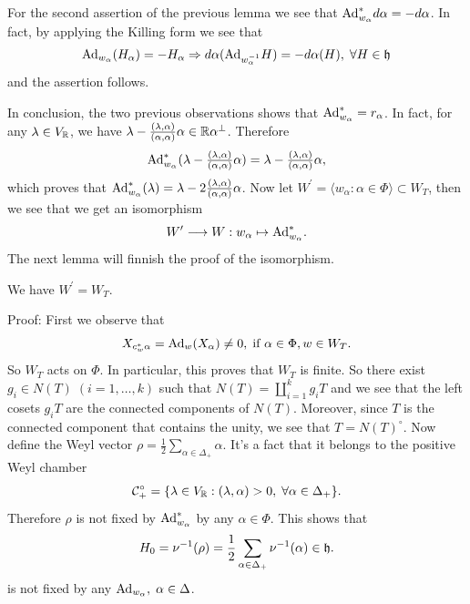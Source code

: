 For the second assertion of the previous lemma we see that $\text{Ad}_{w_\alpha}^*d\alpha=-d\alpha$. In fact, by applying 
the Killing form we see that
\begin{equation}
    \begin{split}
        \text{Ad}_{w_\alpha}(H_\alpha)=-H_\alpha\Rightarrow d\alpha(\text{Ad}_{w_\alpha^{-1}}H)=-d\alpha(H),\;\forall H\in\mathfrak{h}
    \end{split}
\end{equation}
and the assertion follows.\par 

In conclusion, the two previous observations shows that $\text{Ad}_{w_\alpha}^*=r_\alpha$. In fact, for any $\lambda\in V_{\mathbb{R}}$, 
we have $\lambda-\tfrac{(\lambda,\alpha)}{(\alpha,\alpha)}\alpha\in \mathbb{R}\alpha^\perp$. Therefore 
\begin{equation}
    \text{Ad}_{w_\alpha}^*(\lambda-\tfrac{(\lambda,\alpha)}{(\alpha,\alpha)}\alpha)
    =\lambda-\tfrac{(\lambda,\alpha)}{(\alpha,\alpha)}\alpha,
\end{equation}
which proves that $\text{Ad}_{w_\alpha}^*(\lambda)=\lambda-2\tfrac{(\lambda,\alpha)}{(\alpha,\alpha)}\alpha$. Now let 
$W^\prime=\langle w_\alpha:\alpha\in\Phi \rangle\subset W_T$, then we see that we get an isomorphism
\begin{equation}
    W^\prime \longrightarrow W: w_\alpha\mapsto \text{Ad}_{w_\alpha}^*.
\end{equation}
The next lemma will finnish the proof of the isomorphism.

\begin{dang}
    \begin{lemma}
        We have $W^\prime = W_T$.
    \end{lemma}
\end{dang}
Proof: First we observe that
\begin{equation}
    X_{c_w^*\alpha}=\text{Ad}_w(X_\alpha)\neq0,\;\text{if } \alpha\in\Phi,w\in W_T.
\end{equation}
So $W_T$ acts on $\Phi$. In particular, this proves that $W_T$ is finite. So there exist $g_i\in N(T)\;(i=1,\dots,k)$ such that
$N(T)=\coprod_{i=1}^kg_iT$ and we see that the left cosets $g_iT$ are the connected components of $N(T)$. 
Moreover, since $T$ is the connected component that contains the unity, we see that $T=N(T)^\circ$. Now define 
the Weyl vector $\rho=\tfrac12\sum_{\alpha\in\Delta_+}\alpha$. It's a fact that it belongs to the positive Weyl chamber 
\begin{equation}
    \mathcal{C}_+^\circ = \{\lambda\in V_{\mathbb{R}}: (\lambda,\alpha)>0,\;\forall\alpha\in\Delta_+\}.
\end{equation}
Therefore $\rho$ is not fixed by $\text{Ad}_{w_\alpha}^*$ by any $\alpha\in\Phi$. This shows that 
\begin{equation}
   H_0= \nu^{-1}(\rho)=\frac12\sum_{\alpha\in\Delta_+}\nu^{-1}(\alpha)\in\mathfrak{h}.
\end{equation}
is not fixed by any $\text{Ad}_{w_\alpha},\;\alpha\in\Delta$.\par 

